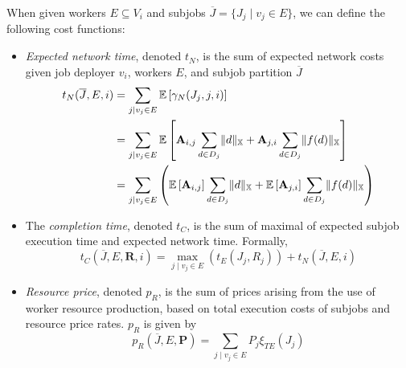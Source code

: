 \documentclass[../mthe-493-project-proposal.tex]{subfiles}
\begin{document}
    When given workers $E \subseteq V_i$ and subjobs $\overline{J} = \{J_j \mid v_j \in E\}$, we can define the following cost functions:
    \begin{itemize}
        \item \textit{Expected network time}, denoted $t_N$, is the sum of expected network costs given job deployer $v_i$, workers $E$, and subjob partition $\overline{J}$
              \begin{align}
                  t_N(\overline{J}, E, i) &= \sum_{j \mid v_j \in E} \mathbb{E} \left[ \gamma_N(J_j, j, i) \right] \label{eq:expected-network-time} \\
                                               &= \sum_{j \mid v_j \in E} \mathbb{E} \left[
                  \mathbf{A}_{i,j} \sum\limits_{d \in D_j} \lVert d\rVert_{\mathbb{X}} + \mathbf{A}_{j,i} \sum\limits_{d \in D_j} \lVert f(d)\rVert_{\mathbb{X}}
                  \right] \nonumber \\
                                               &= \sum_{j \mid v_j \in E} \left( \mathbb{E} \left[ \mathbf{A}_{i,j} \right] \sum\limits_{d \in D_j} \lVert d\rVert_{\mathbb{X}}
                                               + \mathbb{E} \left[ \mathbf{A}_{j,i} \right] \sum\limits_{d \in D_j} \lVert f(d)\rVert_{\mathbb{X}}
                  \right) \nonumber
              \end{align}

        \item The \textit{completion time}, denoted $t_C$, is the sum of maximal of expected subjob execution time and expected network time. Formally,
              \begin{equation}
              \label{eq:completion-time}
                  t_C(\overline{J}, E, \mathbf{R}, i) = \max_{j \mid v_j \in E}
                    \left( t_E(J_j, R_j) \right)
                    + t_N(\overline{J}, E, i)
              \end{equation}

        \item \textit{Resource price}, denoted $p_R$, is the sum of prices arising from the use of worker resource production, based on total execution costs of subjobs and resource price rates. $p_R$ is given by
              \begin{equation}
              \label{eq:resource-price}
                  p_R(\overline{J}, E, \mathbf{P}) = \sum_{j \mid v_j \in E} P_j \xi_{TE}(J_j)
              \end{equation}
    \end{itemize}
\end{document}
